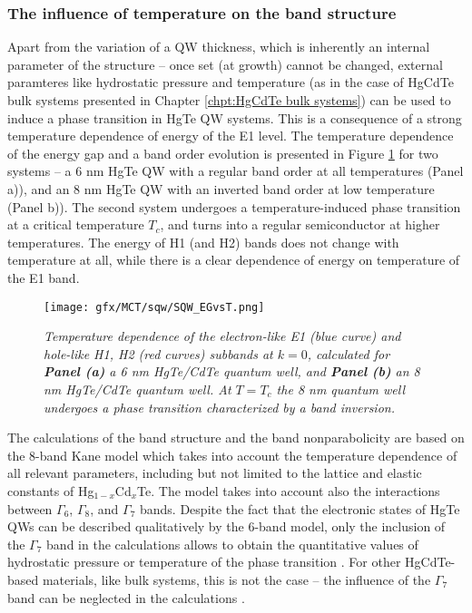 \documentclass[titlepage,a4paper]{book}
\newcommand{\wciecie}{\quad\phantom{v}}
\begin{document}
\subsubsection{The influence of temperature on the band structure}
\wciecie
Apart from the variation of a QW thickness, which is inherently an internal parameter of the structure -- once set (at growth) cannot be changed, external paramteres like hydrostatic pressure \cite{Krishtopenko_pressure} and temperature \cite{Wiedmann_State} (as in the case of HgCdTe bulk systems presented in Chapter \ref{chpt:HgCdTe bulk systems}) can be used to induce a phase transition in HgTe QW systems. This is a consequence of a strong temperature dependence of energy of the E1 level. The temperature dependence of the energy gap and a band order evolution is presented in Figure \ref{fig:SQW_EGvsT} for two systems -- a 6 nm HgTe QW with a regular band order at all temperatures (Panel a)), and an 8 nm HgTe QW with an inverted band order at low temperature (Panel b)). The second system undergoes a temperature-induced phase transition at a critical temperature $T_c$, and turns into a regular semiconductor at higher temperatures. The energy of H1 (and H2) bands does not change with temperature at all, while there is a clear dependence of energy on temperature of the E1 band.

\begin{figure}[ht]
	\centering
	\texttt{[image: gfx/MCT/sqw/SQW\_EGvsT.png]}
	\vspace{-10pt}
	\caption{\textit{Temperature dependence of the electron-like E1 (blue curve) and hole-like H1, H2 (red curves) subbands at $k = 0$, calculated for \textbf{Panel (a)} a 6 nm HgTe/CdTe quantum well, and \textbf{Panel (b)} an 8 nm HgTe/CdTe quantum well. At $T = T_c$ the 8 nm quantum well undergoes a phase transition characterized by a band inversion.}}
	\label{fig:SQW_EGvsT}
\end{figure} 

The calculations of the band structure and the band nonparabolicity are based on the 8-band Kane model which takes into account the temperature dependence of all relevant parameters, including but not limited to the lattice and elastic constants of Hg$_{1-x}$Cd$_x$Te. The model takes into account also the interactions between $\Gamma_6$, $\Gamma_8$, and $\Gamma_7$ bands. Despite the fact that the electronic states of HgTe QWs can be described qualitatively by the 6-band  model, only the inclusion of the $\Gamma_7$ band in the calculations allows to obtain the quantitative values of hydrostatic pressure or temperature of the phase transition \cite{Krishtopenko_pressure}. For other HgCdTe-based materials, like bulk systems, this is not the case -- the influence of the $\Gamma_7$ band can be neglected in the calculations \cite{Malcolm_MCT}.
\end{document}
